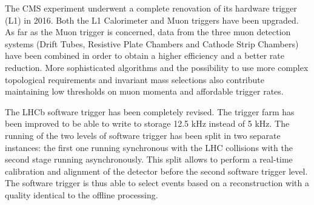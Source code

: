 The CMS experiment underwent a complete renovation of its hardware trigger (L1) in 2016.
Both the L1 Calorimeter and Muon triggers have been upgraded.
As far as the Muon trigger is concerned, data from the three muon detection systems (Drift Tubes, Resistive Plate Chambers and Cathode Strip Chambers) have been combined in order to obtain a higher efficiency and a better rate reduction. 
More sophisticated algorithms and the possibility to use more complex topological requirements and invariant mass selections also contribute maintaining low thresholds on muon momenta and affordable trigger rates.

The LHCb software trigger has been completely revised. 
The trigger farm has been improved to be able to write to storage 12.5 kHz instead of 5 kHz. The running of the two levels of software trigger has been split in two separate instances: 
the first one running synchronous with the LHC collisions with the second stage running asynchronously. 
This split allows to perform a real-time calibration and alignment of the detector before the second software trigger level.
The software trigger is thus able to select events based on a reconstruction with a quality identical to the offline processing.

%  